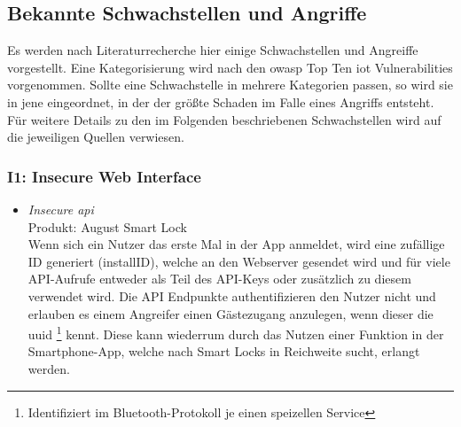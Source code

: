 \subsection{Bekannte Schwachstellen und Angriffe}
\label{sec:analysis_vulns}
    Es werden nach Literaturrecherche hier einige Schwachstellen und Angreiffe vorgestellt. 
    Eine Kategorisierung wird nach den \gls{owasp} Top Ten \gls{iot} Vulnerabilities\cite{Miessler2015} vorgenommen. 
    Sollte eine Schwachstelle in mehrere Kategorien passen, so wird sie in jene eingeordnet, in der der größte Schaden im Falle eines Angriffs entsteht.
    Für weitere Details zu den im Folgenden beschriebenen Schwachstellen wird auf die jeweiligen Quellen verwiesen.
    
    \subsubsection*{I1: Insecure Web Interface}
       \begin{itemize}[leftmargin=0cm,label={}]
            \item \emph{Insecure \gls{api}}\cite{Fuller2017,Lariviere2015}\label{vuln:userenum}\\
                Produkt: August Smart Lock\\
                Wenn sich ein Nutzer das erste Mal in der App anmeldet, wird eine zufällige ID generiert (installID), welche an den Webserver gesendet wird und für viele API-Aufrufe entweder als Teil des API-Keys oder zusätzlich zu diesem verwendet wird. 
                Die API Endpunkte authentifizieren den Nutzer nicht und erlauben es einem Angreifer einen Gästezugang anzulegen, wenn dieser die \gls{uuid}
                \!\footnote{Identifiziert im Bluetooth-Protokoll je einen speizellen Service}
                kennt.
                Diese kann wiederrum durch das Nutzen einer Funktion in der Smartphone-App, welche nach Smart Locks in Reichweite sucht, erlangt werden. 
       \end{itemize} 
       
